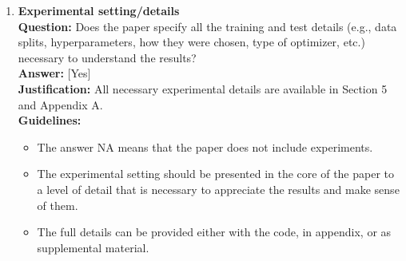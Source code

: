 \begin{enumerate}
\item \textbf{Experimental setting/details}\\
\textbf{Question:} Does the paper specify all the training and test details (e.g., data splits, hyperparameters, how they were chosen, type of optimizer, etc.) necessary to understand the results?\\
\textbf{Answer:} [Yes]\\
\textbf{Justification:} All necessary experimental details are available in Section 5 and Appendix A.\\
\textbf{Guidelines:}
\begin{itemize}
\item The answer NA means that the paper does not include experiments.
\item The experimental setting should be presented in the core of the paper to a level of detail that is necessary to appreciate the results and make sense of them.
\item The full details can be provided either with the code, in appendix, or as supplemental material.
\end{itemize}


\end{enumerate}
